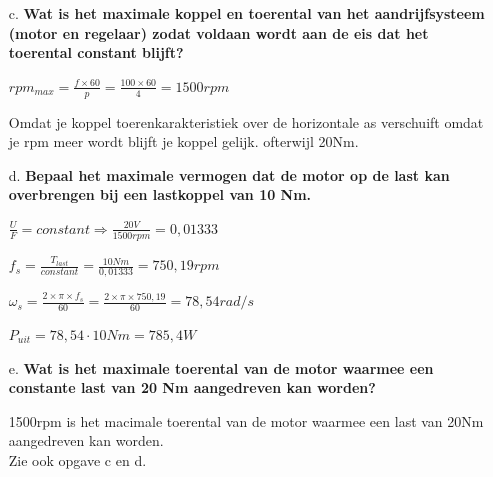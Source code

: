 \begin{enumerate}
    \item [c.] \textbf{Wat is het maximale koppel en toerental van het aandrijfsysteem (motor en regelaar) zodat voldaan wordt aan de eis dat het toerental constant blijft?}
    
        $rpm_{max} = \frac{f \times 60}{p} = \frac{100 \times 60}{4} = 1500rpm$

        Omdat je koppel toerenkarakteristiek over de horizontale as verschuift omdat je rpm meer wordt blijft je koppel gelijk. ofterwijl 20Nm.


    \item [d.] \textbf{Bepaal het maximale vermogen dat de motor op de last kan overbrengen bij een lastkoppel van 10 Nm.}   
    
        $ \frac{U}{F} = constant \Rightarrow \frac{20V}{1500rpm} = 0,01333$

        $ f_{s} = \frac{T_{last}}{constant} = \frac{10Nm}{0,01333} = 750,19 rpm$

        $ \omega_{s} 
        = \frac{2 \times \pi \times f_{s}}{60} 
        = \frac{2 \times \pi \times 750,19}{60} 
        = 78,54 rad/s$

        $ P_{uit} = 78,54 \cdot 10 Nm = 785,4 W$

    \item [e.] \textbf{Wat is het maximale toerental van de motor waarmee een constante last van 20 Nm aangedreven kan worden?}
    
        1500rpm is het macimale toerental van de motor waarmee een last van 20Nm aangedreven kan worden.\\
        Zie ook opgave c en d.

\end{enumerate}